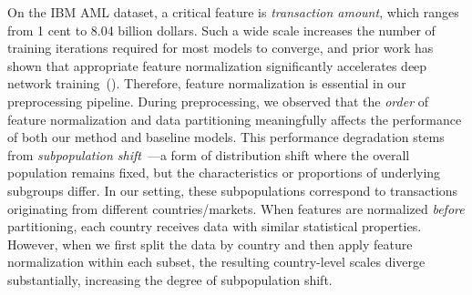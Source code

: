 On the IBM AML dataset, a critical feature is \emph{transaction amount}, which ranges from 1 cent to 8.04 billion dollars. Such a wide scale increases the number of training iterations required for most models to converge, and prior work has shown that appropriate feature normalization significantly accelerates deep network training~(\cite{ioffe2015batch}). Therefore, feature normalization is essential in our preprocessing pipeline. During preprocessing, we observed that the \emph{order} of feature normalization and data partitioning meaningfully affects the performance of both our method and baseline models. This performance degradation stems from \emph{subpopulation shift}~\parencite{koh2021wilds}---a form of distribution shift where the overall population remains fixed, but the characteristics or proportions of underlying subgroups differ. In our setting, these subpopulations correspond to transactions originating from different countries/markets. When features are normalized \emph{before} partitioning, each country receives data with similar statistical properties. However, when we first split the data by country and then apply feature normalization within each subset, the resulting country-level scales diverge substantially, increasing the degree of subpopulation shift.

